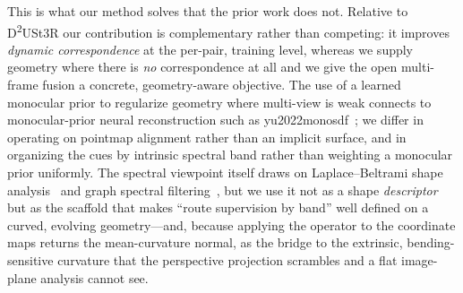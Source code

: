 \documentclass{article}
\newcommand{\R}{\mathbb{R}}
\newcommand{\diag}{\operatorname{diag}}
\newcommand{\SE}{\mathrm{SE}}          %
\begin{document}
This is what our method solves that the prior work does not. Relative to
D\textsuperscript{2}USt3R our contribution is complementary rather than
competing: it improves \emph{dynamic correspondence} at the per-pair, training
level, whereas we supply geometry where there is \emph{no} correspondence at
all and we give the open multi-frame fusion a concrete, geometry-aware
objective. The use of a learned monocular prior to regularize geometry where
multi-view is weak connects to monocular-prior neural reconstruction such as
yu2022monosdf~\cite{yu2022monosdf}; we differ in operating on pointmap alignment rather
than an implicit surface, and in organizing the cues by intrinsic spectral
band rather than weighting a monocular prior uniformly. The spectral viewpoint
itself draws on Laplace--Beltrami shape analysis~\cite{kac1966can,reuter2006laplace,sun2009concise}
and graph spectral filtering~\cite{hammond2011wavelets,defferrard2016convolutional}, but we use it
not as a shape \emph{descriptor} but as the scaffold that makes ``route
supervision by band'' well defined on a curved, evolving geometry---and,
because applying the operator to the coordinate maps returns the
mean-curvature normal, as the bridge to the extrinsic, bending-sensitive
curvature that the perspective projection scrambles and a flat image-plane
analysis cannot see.


%

\end{document}
